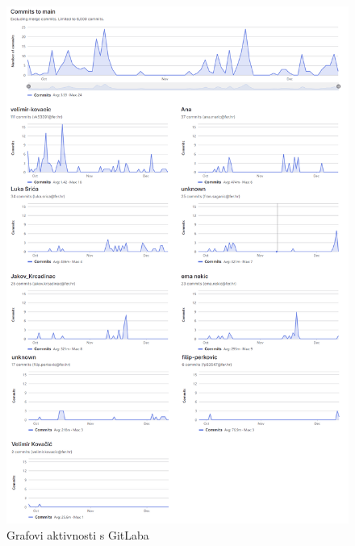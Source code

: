 			\begin{figure}[H]
				\includegraphics[height=0.85\textheight]{slike/komitovi.png}
				\caption{Grafovi aktivnosti s GitLaba}
			\end{figure}
		
	